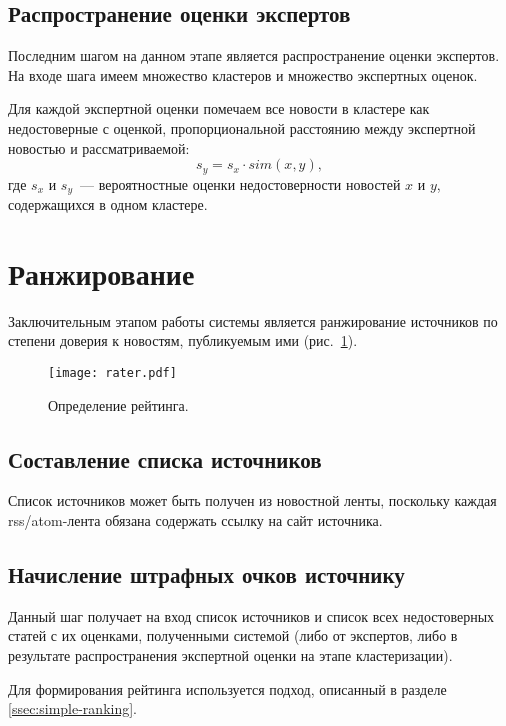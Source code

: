 \subsection{Распространение оценки экспертов}
Последним шагом на данном этапе является распространение оценки экспертов. На входе шага имеем множество кластеров и множество экспертных оценок.

Для каждой экспертной оценки помечаем все новости в кластере как недостоверные с оценкой, пропорциональной расстоянию между экспертной новостью и рассматриваемой:
\begin{equation}
    s_y=s_x\cdot sim(x,y),
\end{equation}
где $s_x$ и $s_y$~--- вероятностные оценки недостоверности новостей $x$ и $y$, содержащихся в одном кластере.

\section{Ранжирование}
Заключительным этапом работы системы является ранжирование источников по степени доверия к новостям, публикуемым ими (рис.~\ref{fig:rater}).

\begin{figure}[h]
    \centering
    \texttt{[image: rater.pdf]}
    \caption{Определение рейтинга.}
    \label{fig:rater}
\end{figure}

\subsection{Составление списка источников}
Список источников может быть получен из новостной ленты, поскольку каждая rss/atom-лента обязана содержать ссылку на сайт источника.

\subsection{Начисление штрафных очков источнику}
Данный шаг получает на вход список источников и список всех недостоверных статей с их оценками, полученными системой (либо от экспертов, либо в результате распространения экспертной оценки на этапе кластеризации).

Для формирования рейтинга используется подход, описанный в разделе \ref{ssec:simple-ranking}.
